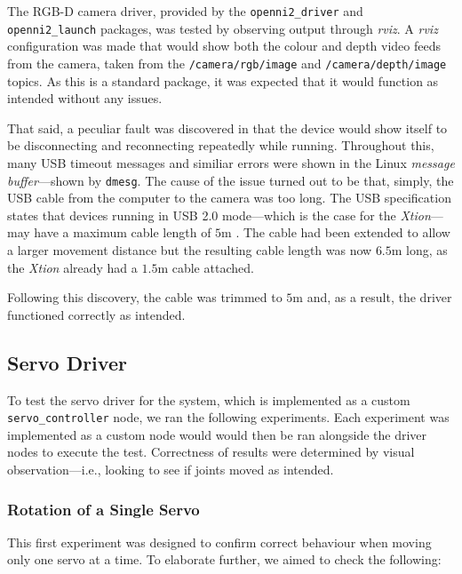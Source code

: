 The RGB-D camera driver, provided by the \texttt{openni2\_driver} and \texttt{openni2\_launch} packages, was tested by observing output through \emph{rviz}. A \emph{rviz} configuration was made that would show both the colour and depth video feeds from the camera, taken from the \texttt{/camera/rgb/image} and \texttt{/camera/depth/image} topics. As this is a standard package, it was expected that it would function as intended without any issues.

That said, a peculiar fault was discovered in that the device would show itself to be disconnecting and reconnecting repeatedly while running. Throughout this, many USB timeout messages and similiar errors were shown in the Linux \emph{message buffer}---shown by \texttt{dmesg}. The cause of the issue turned out to be that, simply, the USB cable from the computer to the camera was too long. The USB specification states that devices running in USB 2.0 mode---which is the case for the \emph{Xtion}---may have a maximum cable length of $5$m \cite{usb_spec}. The cable had been extended to allow a larger movement distance but the resulting cable length was now $6.5$m long, as the \emph{Xtion} already had a $1.5$m cable attached.

Following this discovery, the cable was trimmed to $5$m and, as a result, the driver functioned correctly as intended.

\subsection{Servo Driver}

To test the servo driver for the system, which is implemented as a custom \texttt{servo\_controller} node, we ran the following experiments. Each experiment was implemented as a custom node would would then be ran alongside the driver nodes to execute the test. Correctness of results were determined by visual observation---i.e., looking to see if joints moved as intended. 

\subsubsection{Rotation of a Single Servo}

This first experiment was designed to confirm correct behaviour when moving only one servo at a time. To elaborate further, we aimed to check the following:

